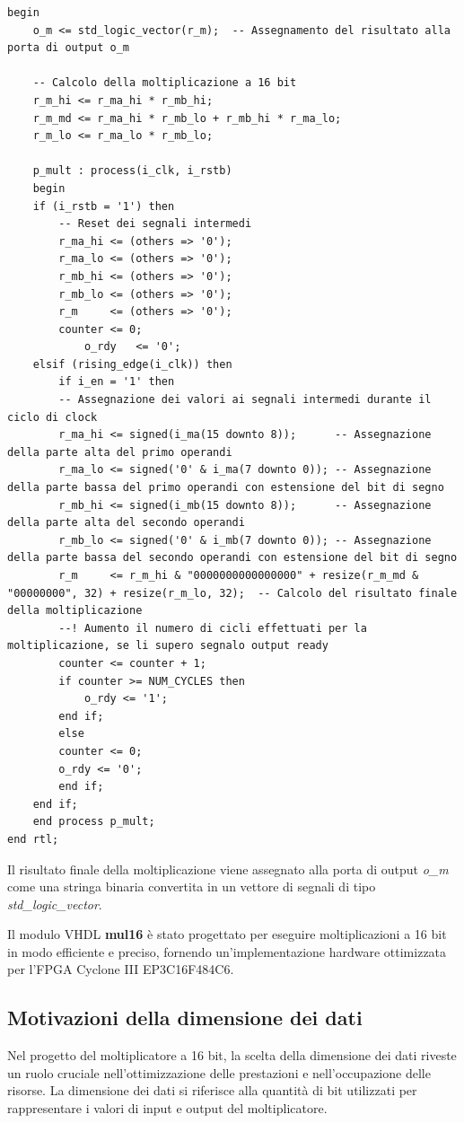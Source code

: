 \documentclass[titlepage]{report}
\begin{document}
\begin{lstlisting}[caption={Processo principale del moltiplicatore}, label={lst:mul16_process}]
begin
	o_m <= std_logic_vector(r_m);  -- Assegnamento del risultato alla porta di output o_m

	-- Calcolo della moltiplicazione a 16 bit
	r_m_hi <= r_ma_hi * r_mb_hi;
	r_m_md <= r_ma_hi * r_mb_lo + r_mb_hi * r_ma_lo;
	r_m_lo <= r_ma_lo * r_mb_lo;

	p_mult : process(i_clk, i_rstb)
	begin
	if (i_rstb = '1') then
		-- Reset dei segnali intermedi
		r_ma_hi <= (others => '0');
		r_ma_lo <= (others => '0');
		r_mb_hi <= (others => '0');
		r_mb_lo <= (others => '0');
		r_m     <= (others => '0');
		counter <= 0;
			o_rdy   <= '0';
	elsif (rising_edge(i_clk)) then
		if i_en = '1' then
		-- Assegnazione dei valori ai segnali intermedi durante il ciclo di clock
		r_ma_hi <= signed(i_ma(15 downto 8));      -- Assegnazione della parte alta del primo operandi
		r_ma_lo <= signed('0' & i_ma(7 downto 0)); -- Assegnazione della parte bassa del primo operandi con estensione del bit di segno
		r_mb_hi <= signed(i_mb(15 downto 8));      -- Assegnazione della parte alta del secondo operandi
		r_mb_lo <= signed('0' & i_mb(7 downto 0)); -- Assegnazione della parte bassa del secondo operandi con estensione del bit di segno
		r_m     <= r_m_hi & "0000000000000000" + resize(r_m_md & "00000000", 32) + resize(r_m_lo, 32);  -- Calcolo del risultato finale della moltiplicazione
		--! Aumento il numero di cicli effettuati per la moltiplicazione, se li supero segnalo output ready
		counter <= counter + 1;
		if counter >= NUM_CYCLES then
			o_rdy <= '1';
		end if;
		else
		counter <= 0;
		o_rdy <= '0';
		end if;
	end if;
	end process p_mult;
end rtl;
		\end{lstlisting}
		
		Il risultato finale della moltiplicazione viene assegnato alla porta di output \textit{o\_m} come una stringa binaria convertita in un vettore di segnali di tipo \textit{std\_logic\_vector}.
		
		Il modulo VHDL \textbf{mul16} è stato progettato per eseguire moltiplicazioni a 16 bit in modo efficiente e preciso, fornendo un'implementazione hardware ottimizzata per l'FPGA Cyclone III EP3C16F484C6.
		
		\subsection{Motivazioni della dimensione dei dati}
		\label{subsec:scelta_dimensione_dati}
			Nel progetto del moltiplicatore a 16 bit, la scelta della dimensione dei dati riveste un ruolo cruciale nell'ottimizzazione delle prestazioni e nell'occupazione delle risorse. La dimensione dei dati si riferisce alla quantità di bit utilizzati per rappresentare i valori di input e output del moltiplicatore.
\end{document}
